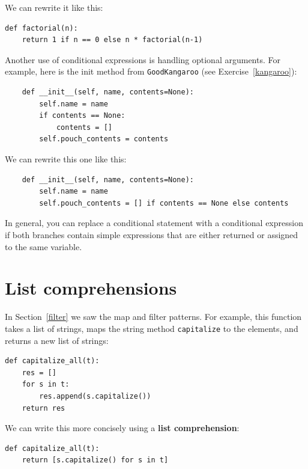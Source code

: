 \documentclass[10pt]{book}
\begin{document}
We can rewrite it like this:

\begin{verbatim}
def factorial(n):
    return 1 if n == 0 else n * factorial(n-1)
\end{verbatim}

Another use of conditional expressions is handling optional
arguments.  For example, here is the init method from
{\tt GoodKangaroo} (see Exercise~\ref{kangaroo}):

\begin{verbatim}
    def __init__(self, name, contents=None):
        self.name = name
        if contents == None:
            contents = []
        self.pouch_contents = contents
\end{verbatim}

We can rewrite this one like this:

\begin{verbatim}
    def __init__(self, name, contents=None):
        self.name = name
        self.pouch_contents = [] if contents == None else contents
\end{verbatim}

In general, you can replace a conditional statement with a conditional
expression if both branches contain simple expressions that are
either returned or assigned to the same variable.



\section{List comprehensions}

In Section~\ref{filter} we saw the map and filter patterns.  For
example, this function takes a list of strings, maps the string method
{\tt capitalize} to the elements, and returns a new list of strings:

\begin{verbatim}
def capitalize_all(t):
    res = []
    for s in t:
        res.append(s.capitalize())
    return res
\end{verbatim}

We can write this more concisely using a {\bf list comprehension}:

\begin{verbatim}
def capitalize_all(t):
    return [s.capitalize() for s in t]
\end{verbatim}
\end{document}
